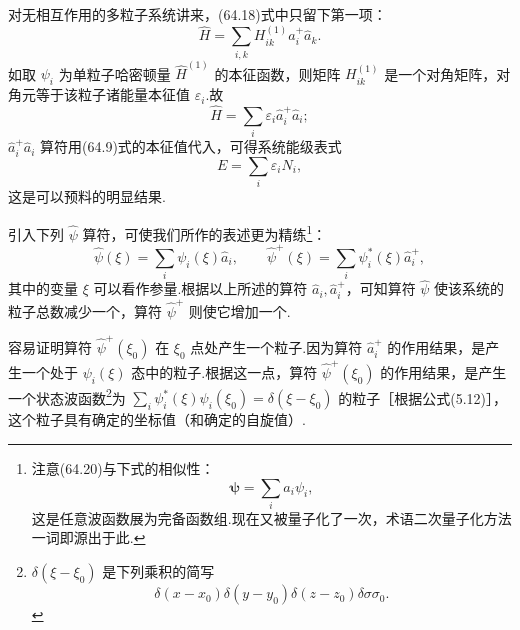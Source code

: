 对无相互作用的多粒子系统讲来，(64.18)式中只留下第一项：
\begin{equation}
  \hat{H}=\sum_{i,k}H_{ik}^{(1)}\hat{a}_i^{+}\hat{a}_k.
\end{equation}
如取 $\psi_i$ 为单粒子哈密顿量 $\hat{H}^{(1)}$ 的本征函数，则矩阵 $H_{ik}^{(1)}$ 是一个对角矩阵，对角元等于该粒子诸能量本征值 $\varepsilon_i$.故
\begin{equation*}
  \hat{H}=\sum_i\varepsilon_i\hat{a}_i^{+}\hat{a}_i;
\end{equation*}
$\hat{a}_i^{+}\hat{a}_i$ 算符用(64.9)式的本征值代入，可得系统能级表式
\begin{equation*}
  E=\sum_i\varepsilon_iN_i,
\end{equation*}
这是可以预料的明显结果.

引入下列 $\hat{\psi}$ 算符，可使我们所作的表述更为精练\footnote{注意(64.20)与下式的相似性：
\begin{equation*}
  \boldsymbol{\psi}=\sum_i a_i\psi_i,
\end{equation*}
这是任意波函数展为完备函数组.现在又被量子化了一次，术语二次量子化方法一词即源出于此.}：
\begin{equation}
  \hat{\psi}(\xi)=\sum_i\psi_i(\xi)\hat{a}_i,\qquad
  \hat{\psi}^{+}(\xi)=\sum_i\psi_i^{*}(\xi)\hat{a}_i^{+},
\end{equation}
其中的变量 $\xi$ 可以看作参量.根据以上所述的算符 $\hat{a}_i,\hat{a}_i^{+}$，可知算符 $\hat{\psi}$ 使该系统的粒子总数减少一个，算符 $\hat{\psi}^{+}$ 则使它增加一个.

容易证明算符 $\hat{\psi}^{+}(\xi_0)$ 在 $\xi_0$ 点处产生一个粒子.因为算符 $\hat{a}_i^{+}$ 的作用结果，是产生一个处于 $\psi_i(\xi)$ 态中的粒子.根据这一点，算符 $\hat{\psi}^{+}(\xi_0)$ 的作用结果，是产生一个状态波函数\footnote{$\delta(\xi-\xi_0)$ 是下列乘积的简写
\begin{equation*}
  \delta(x-x_0)\delta(y-y_0)\delta(z-z_0)\delta\sigma\sigma_0.
\end{equation*}}为 $\sum_i\psi_i^{*}(\xi)\psi_i(\xi_0)=\delta(\xi-\xi_0)$ 的粒子［根据公式(5.12)］，这个粒子具有确定的坐标值（和确定的自旋值）.

